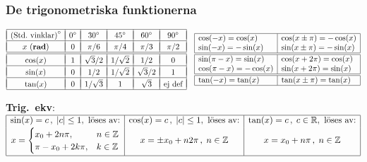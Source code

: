\documentclass{article}
\begin{document}
\subsubsection*{De trigonometriska funktionerna}%

{%
\let\F\frac
\newcommand\CC[1]{#1^\circ}
\def\vPad{&&&&&\\*[-10pt]}
\def\myEnd{\\\hline\vPad}
\newcommand\tW{{\sqrt2}}
\newcommand\tH{{\sqrt3}}
$
\begin{array}{|c|c|c|c|c|c|}
\hline\vPad
\mbox{(Std.~vinklar)}^\circ
  & \CC{0} &\CC{30} &\CC{45} &\CC{60} &\CC{90}   %
 \myEnd
 x \mbox{ (\textbf{rad})}
        & 0     & \pi/6 & \pi/4 &  \pi/3 & \pi/2 %
 \\\hline\hline\vPad
 \cos(x)&   1   & \tH/2 & 1/\tW &  1/2  &   0    %
 \myEnd
 \sin(x)&   0   &   1/2 & 1/\tW & \tH/2 &   1    %
 \myEnd
 \tan(x)&   0   & 1/\tH &   1   & \tH   &
                                    \mbox{ej def}
 \\\hline
\end{array}
\quad
\begin{array}[m]{|l|l|}
\hline
  \cos(-x) = \cos(x)    & \cos(x\pm\pi) = -\cos(x) \\
  \sin(-x) = -\sin(x)   & \sin(x\pm\pi) = -\sin(x) \\
\hline
\hline
  \sin(\pi-x) = \sin(x) &  \cos(x+2\pi) = \cos(x) \\
  \cos(\pi-x) = -\cos(x)&  \sin(x+2\pi) = \sin(x) \\
\hline
\hline
 \tan(-x) = \tan(x)     & \tan(x\pm\pi) = \tan(x) \\
\hline
\end{array}
$
}%

\medskip
\textbf{Trig.~ekv}:
\hbox{
$
\begin{array}[t]{|c|c|c|}
  \hline
  \sin(x)=c\,, \;|c|\leq 1,      \mbox{ löses av:} &
  \cos(x)=c\,, \;|c|\leq 1,      \mbox{ löses av:} &
  \tan(x)=c\,, \;c\in\mathbb{R}, \mbox{ löses av:}
\\[2pt]
x=
\begin{cases}
     x_0+2n\pi,   & n\in\mathbb{Z}\cr
    \pi-x_0+2k\pi,& k\in\mathbb{Z}
\end{cases}
&
x=\pm x_0+n2\pi\,,\;n\in\mathbb{Z}
&x=x_0+n\pi\,,\;n\in\mathbb{Z}
\\[11pt]
\hline
\end{array}
$} %
\end{document}
